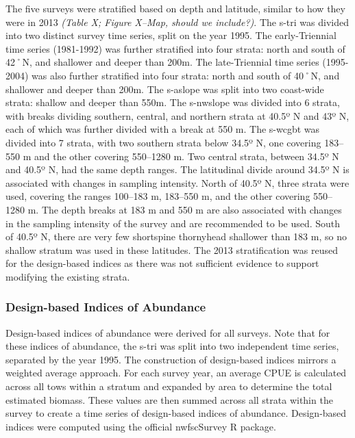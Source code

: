 \documentclass[11pt,
  english,
  letterpaper,
]{article}
\begin{document}
The five surveys were stratified based on depth and latitude, similar to how they were in 2013 \emph{\emph{(Table X; Figure X--Map, should we include?)}}. The \gls{s-tri} was divided into two distinct survey time series, split on the year 1995. The early-Triennial time series (1981-1992) was further stratified into four strata: north and south of 42˚N, and shallower and deeper than 200m. The late-Triennial time series (1995-2004) was also further stratified into four strata: north and south of 40˚N, and shallower and deeper than 200m. The \gls{s-aslope} was split into two coast-wide strata: shallow and deeper than 550m. The \gls{s-nwslope} was divided into 6 strata, with breaks dividing southern, central, and northern strata at 40.5º N and 43º N, each of which was further divided with a break at 550 m. The \gls{s-wcgbt} was divided into 7 strata, with two southern strata below 34.5º N, one covering 183--550 m and the other covering 550--1280 m. Two central strata, between 34.5º N and 40.5º N, had the same depth ranges. The latitudinal divide around 34.5º N is associated with changes in sampling intensity. North of 40.5º N, three strata were used, covering the ranges 100--183 m, 183--550 m, and the other covering 550--1280 m. The depth breaks at 183 m and 550 m are also associated with changes in the sampling intensity of the survey and are recommended to be used. South of 40.5º N, there are very few shortspine thornyhead shallower than 183 m, so no shallow stratum was used in these latitudes. The 2013 stratification was reused for the design-based indices as there was not sufficient evidence to support modifying the existing strata.

\hypertarget{design-based-indices-of-abundance}{%
\subsubsection{Design-based Indices of Abundance}\label{design-based-indices-of-abundance}}

Design-based indices of abundance were derived for all surveys. Note that for these indices of abundance, the \gls{s-tri} was split into two independent time series, separated by the year 1995. The construction of design-based indices mirrors a weighted average approach. For each survey year, an average CPUE is calculated across all tows within a stratum and expanded by area to determine the total estimated biomass. These values are then summed across all strata within the survey to create a time series of design-based indices of abundance. Design-based indices were computed using the official nwfscSurvey R package.
\end{document}
